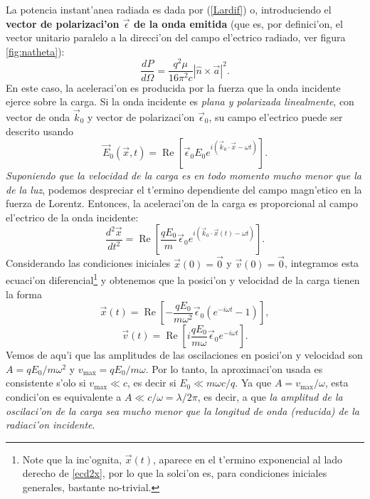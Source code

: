 La potencia instant'anea radiada es dada por (\ref{Lardif}) o, introduciendo el
\textbf{vector de polarizaci'on $\vec{\epsilon}$ de la onda emitida} (que es, por definici'on, el vector unitario paralelo a la direcci'on del campo el'ectrico radiado, ver figura \ref{fig:natheta}):
\begin{equation}
\frac{dP}{d\Omega}=\frac{q^2\mu}{16\pi^2 c}|\hat{n}\times\vec{a}|^2.
\end{equation}
En este caso, la aceleraci'on es producida por la fuerza que la onda incidente ejerce sobre la carga. Si la onda incidente es \textit{plana y polarizada linealmente}, con vector de onda $\vec{k}_0$ y vector de polarizaci'on $\vec{\epsilon}_0$, su campo el'ectrico puede ser descrito usando
\begin{equation}
\vec{E}_0(\vec{x},t)=\operatorname{Re}\left[
\vec{\epsilon}_0E_0e^{i(\vec{k}_0\cdot\vec{x}-\omega t)}\right] .
\end{equation}
\textit{Suponiendo que la velocidad de la carga es en todo momento mucho menor que la de la luz}, podemos despreciar el t'ermino dependiente del campo magn'etico en la fuerza de Lorentz. Entonces, la aceleraci'on de la carga es proporcional al campo el'ectrico de la onda incidente:
\begin{equation}\label{ecd2x}
\frac{d^2\vec{x}}{dt^2}
=\operatorname{Re}\left[\frac{qE_0}{m}\vec{\epsilon}_0e^{i(\vec{k}_0\cdot\vec{x}(t)
-\omega t)}\right] .
\end{equation}
Considerando las condiciones iniciales $\vec{x}(0)=\vec{0}$ y $\vec{v}(0)=\vec{0}$, integramos esta ecuaci'on diferencial\footnote{Note que la inc'ognita, $\vec{x}(t)$, aparece en el t'ermino exponencial al lado derecho de \eqref{ecd2x}, por lo que la solci'on es, para condiciones iniciales generales, bastante no-trivial.} y obtenemos que la posici'on y velocidad de la carga tienen la forma
\begin{equation}
\vec{x}(t)
=\operatorname{Re}\left[-\frac{qE_0}{m\omega^2}\vec{\epsilon}_0(e^{-i\omega t}-1)\right] ,
\end{equation}
\begin{equation}
\vec{v}(t)
=\operatorname{Re}\left[i\frac{qE_0}{m\omega}\vec{\epsilon}_0e^{-i\omega t}\right] .
\end{equation}
Vemos de aqu'i que las amplitudes de las oscilaciones en posici'on y velocidad son
$A={qE_0}/{m\omega^2}$ y $v_{\max}={qE_0}/{m\omega}$. Por lo
tanto, la aproximaci'on usada es consistente s'olo si $v_{\max}\ll c$, es decir si
$E_0\ll {m\omega c}/{q}$. Ya que $A={v_{\max}}/{\omega}$, esta condici'on
es equivalente a $A\ll c/\omega=\lambda/2\pi$, es decir, a que \textit{la amplitud de la oscilaci'on de la carga sea mucho menor que la longitud de onda (reducida) de la radiaci'on incidente}.

